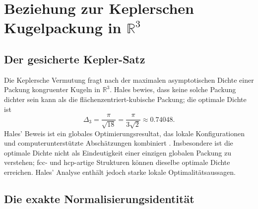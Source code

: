 \documentclass[11pt,a4paper]{article}
\theoremstyle{definition}
\newcommand{\twoI}{2I}
\newcommand{\QI}{Q_I}
\newcommand{\Pgen}{\mathcal P_{\mathrm{gen}}}
\newcommand{\Pall}{\mathcal P_{\mathrm{all}}}
\newcommand{\R}{\mathbb R}
\begin{document}
\begin{center}
\end{center}

\section{Beziehung zur Keplerschen Kugelpackung in \(\R^3\)}

\subsection{Der gesicherte Kepler-Satz}

Die Keplersche Vermutung fragt nach der maximalen asymptotischen Dichte einer Packung kongruenter Kugeln in \(\R^3\). Hales bewies, dass keine solche Packung dichter sein kann als die flächenzentriert-kubische Packung; die optimale Dichte ist
\[
\boxed{
\Delta_3=\frac{\pi}{\sqrt{18}}
=\frac{\pi}{3\sqrt2}
\approx0.74048.
}
\]
Hales' Beweis ist ein globales Optimierungsresultat, das lokale Konfigurationen und computerunterstützte Abschätzungen kombiniert \cite{Hales2005}. Insbesondere ist die optimale Dichte nicht als Eindeutigkeit einer einzigen globalen Packung zu verstehen; fcc- und hcp-artige Strukturen können dieselbe optimale Dichte erreichen. Hales' Analyse enthält jedoch starke lokale Optimalitätsaussagen.

\subsection{Die exakte Normalisierungsidentität}
\end{document}
